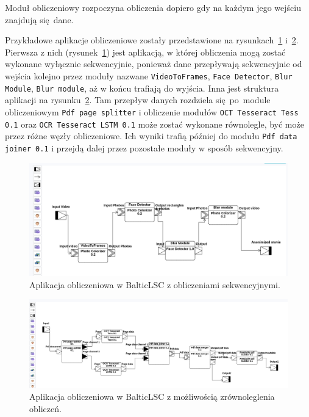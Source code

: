 Moduł obliczeniowy rozpoczyna obliczenia dopiero gdy na każdym jego wejściu
znajdują się dane.

Przykładowe aplikacje obliczeniowe zostały przedstawione na
rysunkach~\ref{rys:sekwencyjna-aplikacja-obliczeniowa}
i~\ref{rys:mozliwa-do-zrownoleglenia-aplikacja-obliczeniowa}.
Pierwsza z nich (rysunek~\ref{rys:sekwencyjna-aplikacja-obliczeniowa}) jest
aplikacją, w której obliczenia mogą zostać wykonane
wyłącznie sekwencyjnie, ponieważ dane przepływają sekwencyjnie od wejścia
kolejno przez moduły nazwane \texttt{VideoToFrames}, \texttt{Face Detector},
\texttt{Blur Module}, \texttt{Blur module}, aż w końcu trafiają do wyjścia.
Inna jest struktura aplikacji na
rysunku~\ref{rys:mozliwa-do-zrownoleglenia-aplikacja-obliczeniowa}. Tam
przepływ danych rozdziela się~po~module obliczeniowym \texttt{Pdf page
	splitter} i obliczenie modułów \texttt{OCT Tesseract Tess 0.1} oraz
\texttt{OCR Tesseract LSTM 0.1} może zostać wykonane równolegle, być może
przez różne węzły obliczeniowe. Ich wyniki trafią później do modułu \texttt{Pdf
	data joiner 0.1} i przejdą dalej przez pozostałe moduły w sposób
sekwencyjny.

\begin{figure}[!ht]
	\centering

	\includegraphics[width=0.95\linewidth]{./images/balticlsc-example-diagram.png}
	\caption{Aplikacja obliczeniowa w BalticLSC z obliczeniami
		sekwencyjnymi.}\label{rys:sekwencyjna-aplikacja-obliczeniowa}
\end{figure}

\begin{figure}[!ht]
	\centering

	\includegraphics[width=0.99\linewidth]{./images/balticlsc-concurrent-application-example.png}
	\caption{Aplikacja obliczeniowa w BalticLSC z możliwością
		zrównoleglenia obliczeń.}\label{rys:mozliwa-do-zrownoleglenia-aplikacja-obliczeniowa}
\end{figure}

